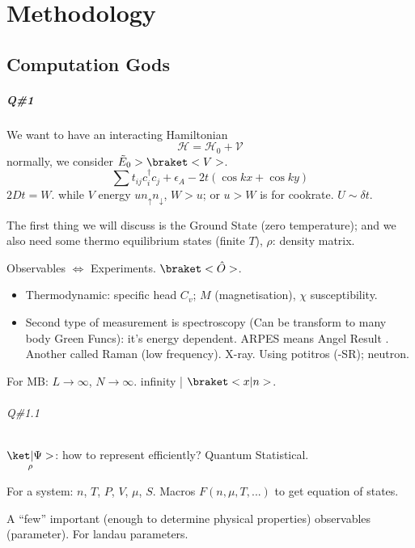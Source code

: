 
\chapter{Methodology}

\section{Computation Gods}

\paragraph{Q\#1}

We want to have an interacting Hamiltonian
\[
  \mathcal H = \mathcal H_0 + \mathcal V
\]
normally, we consider $\tilde E_0 > \braket<V>$.
\[
  \sum t_{ij} c_i^\dagger c_j + \epsilon_A -2t(\cos kx + \cos ky)
\]
$2Dt = W$. while $V$ energy $u n_\uparrow n_\downarrow$, $W > u$; or $u > W$ is for cookrate. $U \sim \delta t$.
\begin{enumext}
  \item The first thing we will discuss is the Ground State (zero temperature);
  and we also need some thermo equilibrium states (finite $T$), $\rho$: density matrix.
  \item Observables $\Leftrightarrow$ Experiments. $\braket<\hat O>$.
  \begin{itemize}
    \item Thermodynamic: specific head $C_v$; $M$ (magnetisation),
    $\chi$ susceptibility.
    \item Second type of measurement is spectroscopy (Can be transform to many body Green Funcs): it's energy dependent. ARPES means Angel Result . Another called Raman (low frequency). X-ray.
    Using potitros (\textmu-SR); neutron.
  \end{itemize}
\end{enumext}

For MB: $L \to \infty$, $N \to \infty$. infinity | $\braket<x|n>$.

\subparagraph{Q\#1.1}

$\underset\rho{\ket|\Psi>}$: how to represent efficiently? \textrightarrow Quantum Statistical.

For a system: $n$, $T$, $P$, $V$, $\mu$, $S$. Macros
$F(n, \mu, T, ...)$ to get equation of states.

A ``few'' important (enough to determine physical properties)
observables (parameter).
For landau parameters.

